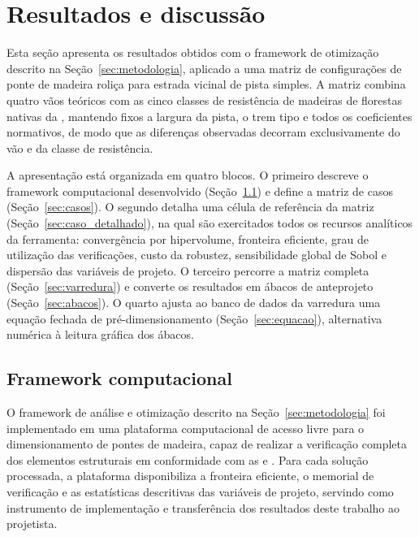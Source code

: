 \section{Resultados e discussão}\label{sec:resultados}

Esta seção apresenta os resultados obtidos com o framework de otimização descrito na Seção~\ref{sec:metodologia}, aplicado a uma matriz de configurações de ponte de madeira roliça para estrada vicinal de pista simples.
A matriz combina quatro vãos teóricos com as cinco classes de resistência de madeiras de florestas nativas da \textcite{NBR7190-1:2022}, mantendo fixos a largura da pista, o trem tipo e todos os coeficientes normativos, de modo que as diferenças observadas decorram exclusivamente do vão e da classe de resistência.

A apresentação está organizada em quatro blocos.
O primeiro descreve o framework computacional desenvolvido (Seção~\ref{sec:plataforma}) e define a matriz de casos (Seção~\ref{sec:casos}).
O segundo detalha uma célula de referência da matriz (Seção~\ref{sec:caso_detalhado}), na qual são exercitados todos os recursos analíticos da ferramenta: convergência por hipervolume, fronteira eficiente, grau de utilização das verificações, custo da robustez, sensibilidade global de Sobol e dispersão das variáveis de projeto.
O terceiro percorre a matriz completa (Seção~\ref{sec:varredura}) e converte os resultados em ábacos de anteprojeto (Seção~\ref{sec:abacos}).
O quarto ajusta ao banco de dados da varredura uma equação fechada de pré-dimensionamento (Seção~\ref{sec:equacao}), alternativa numérica à leitura gráfica dos ábacos.


\subsection{Framework computacional}\label{sec:plataforma}

O framework de análise e otimização descrito na Seção~\ref{sec:metodologia} foi implementado em uma plataforma computacional de acesso livre para o dimensionamento de pontes de madeira, capaz de realizar a verificação completa dos elementos estruturais em conformidade com as \textcite{NBR7190-1:2022} e \textcite{nbr7188} \parencite{ReliaBridge2026}.
Para cada solução processada, a plataforma disponibiliza a fronteira eficiente, o memorial de verificação e as estatísticas descritivas das variáveis de projeto, servindo como instrumento de implementação e transferência dos resultados deste trabalho ao projetista.

